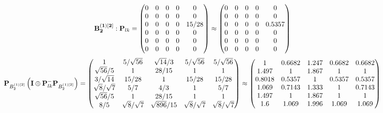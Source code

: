 \documentclass[10pt,a4paper]{article}
\begin{document}
	\[
		\bold{B_2^{(1)[2]}}: \bold{P}_{lk} = 
		\begin{pmatrix}
			{{0}}{} & {{0}}{} & {{0}}{} & {{0}}{} & {{0}}{} \\
			{{0}}{} & {{0}}{} & {{0}}{} & {{0}}{} & {{0}}{} \\
			{{0}}{} & {{0}}{} & {{0}}{} & {{0}}{} & {{15}} / {{28}} \\
			{{0}}{} & {{0}}{} & {{0}}{} & {{0}}{} & {{0}}{} \\
			{{0}}{} & {{0}}{} & {{0}}{} & {{0}}{} & {{0}}{} \\
			{{0}}{} & {{0}}{} & {{0}}{} & {{0}}{} & {{0}}{} \\
		\end{pmatrix}
		\approx
		\begin{pmatrix}
			0        & 0        & 0        & 0        & 0        \\
			0        & 0        & 0        & 0        & 0        \\
			0        & 0        & 0        & 0        & 0.5357   \\
			0        & 0        & 0        & 0        & 0        \\
			0        & 0        & 0        & 0        & 0        \\
			0        & 0        & 0        & 0        & 0        \\
		\end{pmatrix}
	\]
	\[
		\bold{P}_{B_2^{(1)[2]}}\left(\bold{I} \oplus \bold{P}_{lk}^{-}\bold{P}_{B_2^{(1)[2]}}\right) = 
		\begin{pmatrix}
			{1}{} & {{5}} / {\sqrt{56}} & {\sqrt{14}} / {{3}} & {{5}} / {\sqrt{56}} & {{5}} / {\sqrt{56}} \\
			{\sqrt{56}} / {{5}} & {1}{} & {{28}} / {{15}} & {1}{} & {1}{} \\
			{{3}} / {\sqrt{14}} & {{15}} / {{28}} & {1}{} & {{15}} / {{28}} & {{15}} / {{28}} \\
			{\sqrt{8}} / {\sqrt{7}} & {{5}} / {{7}} & {{4}} / {{3}} & {1}{} & {{5}} / {{7}} \\
			{\sqrt{56}} / {{5}} & {1}{} & {{28}} / {{15}} & {1}{} & {1}{} \\
			{{8}} / {{5}} & {\sqrt{8}} / {\sqrt{7}} & {\sqrt{896}} / {{15}} & {\sqrt{8}} / {\sqrt{7}} & {\sqrt{8}} / {\sqrt{7}} \\
		\end{pmatrix}
		\approx
		\begin{pmatrix}
			1        & 0.6682   & 1.247    & 0.6682   & 0.6682   \\
			1.497    & 1        & 1.867    & 1        & 1        \\
			0.8018   & 0.5357   & 1        & 0.5357   & 0.5357   \\
			1.069    & 0.7143   & 1.333    & 1        & 0.7143   \\
			1.497    & 1        & 1.867    & 1        & 1        \\
			1.6      & 1.069    & 1.996    & 1.069    & 1.069    \\
		\end{pmatrix}
	\]
\end{document}
